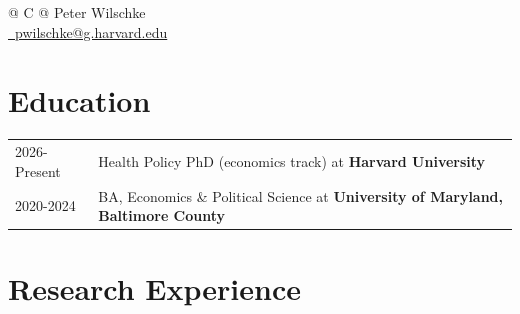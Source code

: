\documentclass[a4paper,11pt]{article}
\begin{document}
\pagestyle{empty} 


\begin{tabularx}{\linewidth}{@{} C @{}}
\huge{Peter Wilschke} \\[7.5pt]
\href{mailto:pwilschke@g.harvard.edu}{\raisebox{-0.05\height}\faEnvelope \ pwilschke@g.harvard.edu} \\
\end{tabularx}


\section{Education}
\begin{tabularx}{\linewidth}{@{}l X@{}}	

2026-Present & Health Policy PhD (economics track) at \textbf{Harvard University} \\

2020-2024 & BA, Economics \& Political Science at \textbf{University of Maryland, Baltimore County} \\ 

\end{tabularx}

\section{Research Experience}
\end{document}
